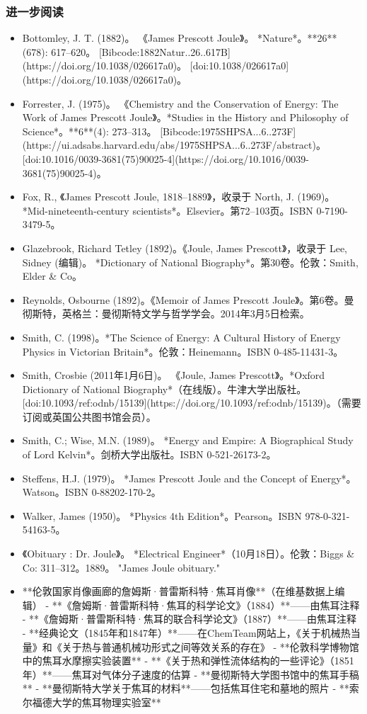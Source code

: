 \subsubsection{进一步阅读}
\begin{itemize}
\item Bottomley, J. T. (1882)。 《James Prescott Joule》。 *Nature*。**26** (678): 617–620。 [Bibcode:1882Natur..26..617B](https://doi.org/10.1038/026617a0)。 [doi:10.1038/026617a0](https://doi.org/10.1038/026617a0)。
\item Forrester, J. (1975)。 《Chemistry and the Conservation of Energy: The Work of James Prescott Joule》。*Studies in the History and Philosophy of Science*。**6**(4): 273–313。 [Bibcode:1975SHPSA...6..273F](https://ui.adsabs.harvard.edu/abs/1975SHPSA...6..273F/abstract)。 [doi:10.1016/0039-3681(75)90025-4](https://doi.org/10.1016/0039-3681(75)90025-4)。
\item Fox, R., 《James Prescott Joule, 1818–1889》，收录于 North, J. (1969)。 *Mid-nineteenth-century scientists*。Elsevier。第72–103页。ISBN 0-7190-3479-5。
\item Glazebrook, Richard Tetley (1892)。《Joule, James Prescott》，收录于 Lee, Sidney (编辑)。 *Dictionary of National Biography*。第30卷。伦敦：Smith, Elder & Co。
\item Reynolds, Osbourne (1892)。《Memoir of James Prescott Joule》。第6卷。曼彻斯特，英格兰：曼彻斯特文学与哲学学会。2014年3月5日检索。
\item Smith, C. (1998)。*The Science of Energy: A Cultural History of Energy Physics in Victorian Britain*。伦敦：Heinemann。ISBN 0-485-11431-3。
\item Smith, Crosbie (2011年1月6日)。 《Joule, James Prescott》。*Oxford Dictionary of National Biography*（在线版）。牛津大学出版社。[doi:10.1093/ref:odnb/15139](https://doi.org/10.1093/ref:odnb/15139)。（需要订阅或英国公共图书馆会员）。
\item Smith, C.; Wise, M.N. (1989)。 *Energy and Empire: A Biographical Study of Lord Kelvin*。剑桥大学出版社。ISBN 0-521-26173-2。
\item Steffens, H.J. (1979)。 *James Prescott Joule and the Concept of Energy*。Watson。ISBN 0-88202-170-2。
\item Walker, James (1950)。 *Physics 4th Edition*。Pearson。ISBN 978-0-321-54163-5。
\item 《Obituary : Dr. Joule》。 *Electrical Engineer*（10月18日）。伦敦：Biggs & Co: 311–312。1889。 "James Joule obituary."
\end{itemize}


\begin{itemize}
\item  **伦敦国家肖像画廊的詹姆斯·普雷斯科特·焦耳肖像**（在维基数据上编辑）  
- **《詹姆斯·普雷斯科特·焦耳的科学论文》（1884）**——由焦耳注释  
- **《詹姆斯·普雷斯科特·焦耳的联合科学论文》（1887）**——由焦耳注释  
- **经典论文（1845年和1847年）**——在ChemTeam网站上，《关于机械热当量》和《关于热与普通机械功形式之间等效关系的存在》  
- **伦敦科学博物馆中的焦耳水摩擦实验装置**  
- **《关于热和弹性流体结构的一些评论》（1851年）**——焦耳对气体分子速度的估算  
- **曼彻斯特大学图书馆中的焦耳手稿**  
- **曼彻斯特大学关于焦耳的材料**——包括焦耳住宅和墓地的照片  
- **索尔福德大学的焦耳物理实验室**
\end{itemize}
